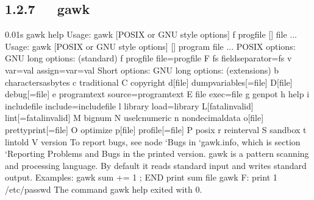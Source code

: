 \documentclass[letterpaper,12pt,english]{sphinxmanual}
\begin{document}
\subsection{1.2.7   gawk}
\label{\detokenize{001software/001install/linux:gawk}}
\begin{sphinxVerbatim}[commandchars=\\\{\}]
0.01s\PYGZdl{} gawk \PYGZhy{}\PYGZhy{}help
Usage: gawk [POSIX or GNU style options] \PYGZhy{}f progfile [\PYGZhy{}\PYGZhy{}] file ...
Usage: gawk [POSIX or GNU style options] [\PYGZhy{}\PYGZhy{}] \PYGZsq{}program\PYGZsq{} file ...
POSIX options:    GNU long options: (standard)
  \PYGZhy{}f progfile   \PYGZhy{}\PYGZhy{}file=progfile
  \PYGZhy{}F fs     \PYGZhy{}\PYGZhy{}field\PYGZhy{}separator=fs
  \PYGZhy{}v var=val    \PYGZhy{}\PYGZhy{}assign=var=val
Short options:    GNU long options: (extensions)
  \PYGZhy{}b      \PYGZhy{}\PYGZhy{}characters\PYGZhy{}as\PYGZhy{}bytes
  \PYGZhy{}c      \PYGZhy{}\PYGZhy{}traditional
  \PYGZhy{}C      \PYGZhy{}\PYGZhy{}copyright
  \PYGZhy{}d[file]    \PYGZhy{}\PYGZhy{}dump\PYGZhy{}variables[=file]
  \PYGZhy{}D[file]    \PYGZhy{}\PYGZhy{}debug[=file]
  \PYGZhy{}e \PYGZsq{}program\PYGZhy{}text\PYGZsq{} \PYGZhy{}\PYGZhy{}source=\PYGZsq{}program\PYGZhy{}text\PYGZsq{}
  \PYGZhy{}E file     \PYGZhy{}\PYGZhy{}exec=file
  \PYGZhy{}g      \PYGZhy{}\PYGZhy{}gen\PYGZhy{}pot
  \PYGZhy{}h      \PYGZhy{}\PYGZhy{}help
  \PYGZhy{}i includefile    \PYGZhy{}\PYGZhy{}include=includefile
  \PYGZhy{}l library    \PYGZhy{}\PYGZhy{}load=library
  \PYGZhy{}L[fatal\textbar{}invalid] \PYGZhy{}\PYGZhy{}lint[=fatal\textbar{}invalid]
  \PYGZhy{}M      \PYGZhy{}\PYGZhy{}bignum
  \PYGZhy{}N      \PYGZhy{}\PYGZhy{}use\PYGZhy{}lc\PYGZhy{}numeric
  \PYGZhy{}n      \PYGZhy{}\PYGZhy{}non\PYGZhy{}decimal\PYGZhy{}data
  \PYGZhy{}o[file]    \PYGZhy{}\PYGZhy{}pretty\PYGZhy{}print[=file]
  \PYGZhy{}O      \PYGZhy{}\PYGZhy{}optimize
  \PYGZhy{}p[file]    \PYGZhy{}\PYGZhy{}profile[=file]
  \PYGZhy{}P      \PYGZhy{}\PYGZhy{}posix
  \PYGZhy{}r      \PYGZhy{}\PYGZhy{}re\PYGZhy{}interval
  \PYGZhy{}S      \PYGZhy{}\PYGZhy{}sandbox
  \PYGZhy{}t      \PYGZhy{}\PYGZhy{}lint\PYGZhy{}old
  \PYGZhy{}V      \PYGZhy{}\PYGZhy{}version
To report bugs, see node {}`Bugs\PYGZsq{} in {}`gawk.info\PYGZsq{}, which is
section {}`Reporting Problems and Bugs\PYGZsq{} in the printed version.
gawk is a pattern scanning and processing language.
By default it reads standard input and writes standard output.
Examples:
  gawk \PYGZsq{}\PYGZob{} sum += \PYGZdl{}1 \PYGZcb{}; END \PYGZob{} print sum \PYGZcb{}\PYGZsq{} file
  gawk \PYGZhy{}F: \PYGZsq{}\PYGZob{} print \PYGZdl{}1 \PYGZcb{}\PYGZsq{} /etc/passwd
The command \PYGZdq{}gawk \PYGZhy{}\PYGZhy{}help\PYGZdq{} exited with 0.
\end{sphinxVerbatim}
\end{document}
